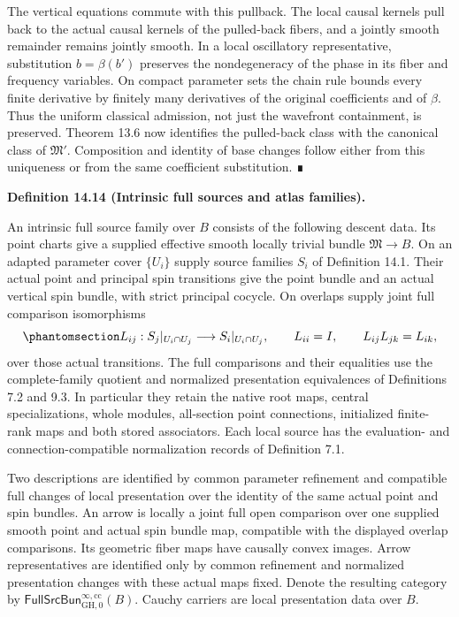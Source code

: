 \documentclass[
  english,
  11pt,
  reqno]{amsart}
\makeatletter
\newcommand{\pandocstatementheading}[1]{%
  \par\addpenalty{\@beginparpenalty}%
  \addvspace{.5\baselineskip plus .2\baselineskip minus .2\baselineskip}%
  {\normalfont\bfseries #1\par}%
  \nobreak\@afterindenttrue\@afterheading
}
\makeatother
\begin{document}
The vertical equations commute with this pullback. The local causal
kernels pull back to the actual causal kernels of the pulled-back
fibers, and a jointly smooth remainder remains jointly smooth. In a
local oscillatory representative, substitution \(b=\beta(b')\) preserves
the nondegeneracy of the phase in its fiber and frequency variables. On
compact parameter sets the chain rule bounds every finite derivative by
finitely many derivatives of the original coefficients and of \(\beta\).
Thus the uniform classical admission, not just the wavefront
containment, is preserved. Theorem 13.6 now identifies the pulled-back
class with the canonical class of \(\mathfrak M'\). Composition and
identity of base changes follow either from this uniqueness or from the
same coefficient substitution. ∎

\pandocstatementheading{\protect{}\label{def:intrinsic-full-source-families}Definition 14.14 (Intrinsic full sources and atlas families).}

An intrinsic full source family over \(B\) consists of the following
descent data. Its point charts give a supplied effective smooth locally
trivial bundle \(\mathfrak M\to B\). On an adapted parameter cover
\(\{U_i\}\) supply source families \(S_i\) of Definition 14.1. Their
actual point and principal spin transitions give the point bundle and an
actual vertical spin bundle, with strict principal cocycle. On overlaps
supply joint full comparison isomorphisms
\begin{equation}\protect\phantomsection\label{eq:intrinsic-full-source-cocycle}{
L_{ij}:S_j|_{U_i\cap U_j}\longrightarrow S_i|_{U_i\cap U_j},
\qquad
L_{ii}=I,\qquad L_{ij}L_{jk}=L_{ik},
}\end{equation} over those actual transitions. The full comparisons and
their equalities use the complete-family quotient and normalized
presentation equivalences of Definitions 7.2 and 9.3. In particular they
retain the native root maps, central specializations, whole modules,
all-section point connections, initialized finite-rank maps and both
stored associators. Each local source has the evaluation- and
connection-compatible normalization records of Definition 7.1.

Two descriptions are identified by common parameter refinement and
compatible full changes of local presentation over the identity of the
same actual point and spin bundles. An arrow is locally a joint full
open comparison over one supplied smooth point and actual spin bundle
map, compatible with the displayed overlap comparisons. Its geometric
fiber maps have causally convex images. Arrow representatives are
identified only by common refinement and normalized presentation changes
with these actual maps fixed. Denote the resulting category by
\(\mathsf{FullSrcBun}^{\infty,\mathrm{cc}}_{\mathrm{GH},0}(B)\). Cauchy
carriers are local presentation data over \(B\).
\end{document}
